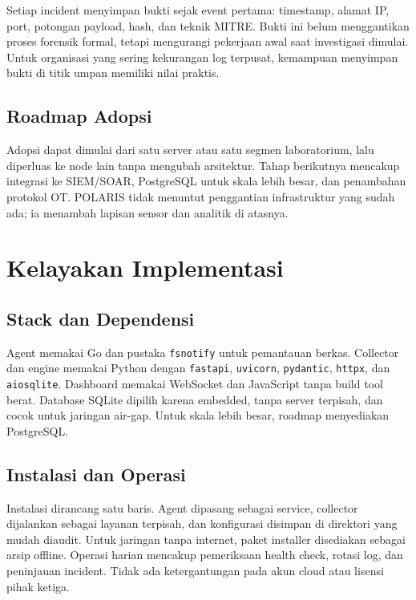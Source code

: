 \documentclass[12pt,a4paper]{article}
\begin{document}
Setiap incident menyimpan bukti sejak event pertama: timestamp, alamat IP, port, potongan payload, hash, dan teknik MITRE. Bukti ini belum menggantikan proses forensik formal, tetapi mengurangi pekerjaan awal saat investigasi dimulai. Untuk organisasi yang sering kekurangan log terpusat, kemampuan menyimpan bukti di titik umpan memiliki nilai praktis.

\subsection{Roadmap Adopsi}

Adopsi dapat dimulai dari satu server atau satu segmen laboratorium, lalu diperluas ke node lain tanpa mengubah arsitektur. Tahap berikutnya mencakup integrasi ke SIEM/SOAR, PostgreSQL untuk skala lebih besar, dan penambahan protokol OT. POLARIS tidak menuntut penggantian infrastruktur yang sudah ada; ia menambah lapisan sensor dan analitik di atasnya.

\section{Kelayakan Implementasi}

\subsection{Stack dan Dependensi}

Agent memakai Go dan pustaka \texttt{fsnotify} untuk pemantauan berkas. Collector dan engine memakai Python dengan \texttt{fastapi}, \texttt{uvicorn}, \texttt{pydantic}, \texttt{httpx}, dan \texttt{aiosqlite}. Dashboard memakai WebSocket dan JavaScript tanpa build tool berat. Database SQLite dipilih karena embedded, tanpa server terpisah, dan cocok untuk jaringan air-gap. Untuk skala lebih besar, roadmap menyediakan PostgreSQL.

\subsection{Instalasi dan Operasi}

Instalasi dirancang satu baris. Agent dipasang sebagai service, collector dijalankan sebagai layanan terpisah, dan konfigurasi disimpan di direktori yang mudah diaudit. Untuk jaringan tanpa internet, paket installer disediakan sebagai arsip offline. Operasi harian mencakup pemeriksaan health check, rotasi log, dan peninjauan incident. Tidak ada ketergantungan pada akun cloud atau lisensi pihak ketiga.
\end{document}

